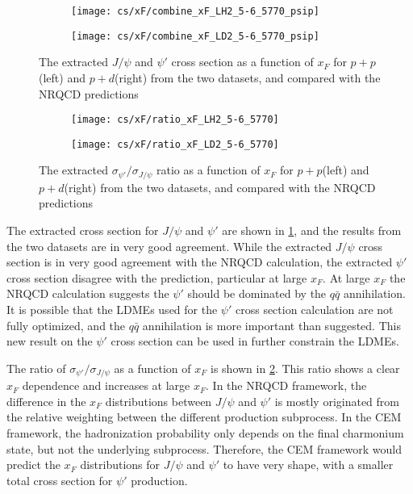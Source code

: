 \documentclass[../main.tex]{subfiles}
\begin{document}
\begin{figure}[h!]
	\centering
	\begin{subfigure}{0.45\linewidth}
		\texttt{[image: cs/xF/combine\_xF\_LH2\_5-6\_5770\_psip]}
	\end{subfigure}
	\centering
	\begin{subfigure}{0.45\linewidth}
		\texttt{[image: cs/xF/combine\_xF\_LD2\_5-6\_5770\_psip]}
	\end{subfigure}
	\caption{The extracted $J/\psi$ and $\psi'$ cross section as a function of $x_F$ for $p+p$(left)
		and $p+d$(right) from the two datasets,	and compared with the NRQCD predictions}
	\label{fig:cs_xF_combined}
\end{figure}
\begin{figure}[h!]
	\centering
	\begin{subfigure}{0.45\linewidth}
		\texttt{[image: cs/xF/ratio\_xF\_LH2\_5-6\_5770]}
	\end{subfigure}
	\begin{subfigure}{0.45\linewidth}
		\texttt{[image: cs/xF/ratio\_xF\_LD2\_5-6\_5770]}
	\end{subfigure}
	\caption{The extracted  $\sigma_{\psi'}/\sigma_{J/\psi}$ ratio as a function of $x_F$ for $p+p$(left)
		and $p+d$(right) from the two datasets,	and compared with the NRQCD predictions}
	\label{fig:cs_xF_ratio}
\end{figure}

The extracted cross section for $J/\psi$ and $\psi'$ are shown in \cref{fig:cs_xF_combined}, and
the results from the two datasets are in very good agreement. While the extracted
$J/\psi$ cross section is in very good agreement with the NRQCD calculation, the extracted $\psi'$
cross section disagree with the prediction, particular at large $x_F$. At large $x_F$ the NRQCD
calculation suggests the $\psi'$ should be dominated by the $q\bar{q}$ annihilation.
It is possible that the LDMEs used  for the $\psi'$ cross section calculation are not fully optimized,
and the $q\bar{q}$ annihilation is more important than suggested. This new result on the $\psi'$
cross section can be used in further constrain the LDMEs. 

The ratio of $\sigma_{\psi'}/\sigma_{J/\psi}$ as a function of $x_F$ is shown in \cref{fig:cs_xF_ratio}.
This ratio shows a clear $x_F$ dependence and increases at large $x_F$. In the NRQCD framework,
 the difference in the $x_F$ distributions between $J/\psi$ and $\psi'$ is mostly originated 
from the relative weighting between the different production subprocess. 
In the CEM framework, the hadronization probability only depends on
the final charmonium state, but not the underlying subprocess. Therefore, the CEM framework would predict
the $x_F$ distributions for $J/\psi$ and $\psi'$ to have very shape, with a smaller total cross section
for $\psi'$ production.
\end{document}
